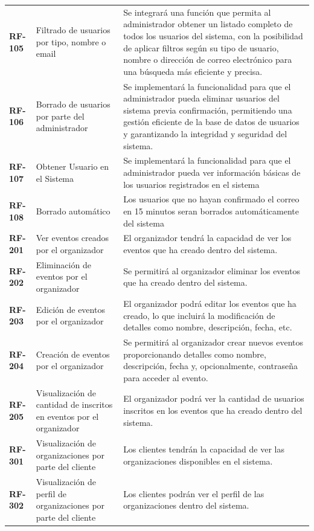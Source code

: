 \begin{longtable}{ p{2.5cm} p{4cm} p{9cm}  }
    \textbf{RF-105} & Filtrado de usuarios por tipo, nombre o email & Se integrará una función que permita al administrador obtener un 
    listado completo de todos los usuarios del sistema, con la posibilidad de aplicar filtros según su tipo de usuario, nombre o dirección 
    de correo electrónico para una búsqueda más eficiente y precisa.\\
    \textbf{RF-106} & Borrado de usuarios por parte del administrador & Se implementará la funcionalidad para que el administrador pueda 
    eliminar usuarios del sistema previa confirmación, permitiendo una gestión eficiente de la base de datos de usuarios y garantizando la integridad 
    y seguridad del sistema.\\
    \textbf{RF-107} & Obtener Usuario en el Sistema & Se implementará la funcionalidad para que el administrador pueda 
    ver información básicas de los usuarios registrados en el sistema\\
    \textbf{RF-108} & Borrado automático & Los usuarios que no hayan confirmado el correo en 15 minutos seran borrados automáticamente del sistema\\
    \textbf{RF-201} & Ver eventos creados por el organizador & El organizador tendrá la capacidad de ver los eventos que ha creado dentro del sistema.\\
    \textbf{RF-202} & Eliminación de eventos por el organizador & Se permitirá al organizador eliminar los eventos que ha creado dentro del sistema.\\
    \textbf{RF-203} & Edición de eventos por el organizador & El organizador podrá editar los eventos que ha creado, lo que incluirá la modificación de 
    detalles como nombre, descripción, fecha, etc.\\
    \textbf{RF-204} & Creación de eventos por el organizador & Se permitirá al organizador crear nuevos eventos proporcionando detalles como nombre, descripción, 
    fecha y, opcionalmente, contraseña para acceder al evento.\\
    \textbf{RF-205} & Visualización de cantidad de inscritos en eventos por el organizador & El organizador podrá ver la cantidad de usuarios inscritos en los 
    eventos que ha creado dentro del sistema.\\
    \textbf{RF-301} & Visualización de organizaciones por parte del cliente & Los clientes tendrán la capacidad de ver las organizaciones disponibles en el sistema.\\
    \textbf{RF-302} & Visualización de perfil de organizaciones por parte del cliente & Los clientes podrán ver el perfil de las organizaciones dentro del sistema.\\

\end{longtable}

